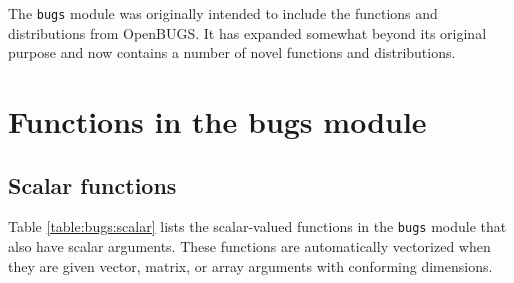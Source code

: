 \documentclass[11pt, a4paper, titlepage]{report}
\newcommand{\OpenBUGS}{\textsf{OpenBUGS}}
\begin{document}
The \texttt{bugs} module was originally intended to include the
functions and distributions from \OpenBUGS. It has expanded somewhat
beyond its original purpose and now contains a number of novel
functions and distributions.

\section{Functions in the bugs module}
\label{section:bugs:functions}

\subsection{Scalar functions}

Table \ref{table:bugs:scalar} lists the scalar-valued functions in the
\texttt{bugs} module that also have scalar arguments.  These functions
are automatically vectorized when they are given vector, matrix, or
array arguments with conforming dimensions.
\end{document}
